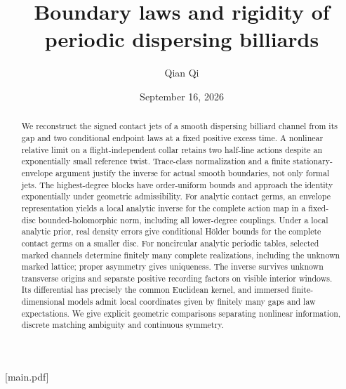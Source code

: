 
[main.pdf]
\title[Boundary laws and periodic rigidity]{Boundary laws and rigidity of periodic dispersing billiards}
\author{Qian Qi}
\date{September 16, 2026}


\begin{abstract}
We reconstruct the signed contact jets of a smooth dispersing billiard
channel from its gap and two conditional endpoint laws at a fixed positive
excess time. A nonlinear relative limit on a flight-independent collar
retains two half-line actions despite an exponentially small reference
twist. Trace-class normalization and a finite stationary-envelope argument
justify the inverse for actual smooth boundaries, not only formal jets.
The highest-degree blocks have order-uniform bounds and approach the
identity exponentially under geometric admissibility.
For analytic contact germs, an envelope representation yields a local
analytic inverse for the complete action map in a fixed-disc
bounded-holomorphic norm, including all lower-degree couplings.
Under a local analytic prior, real density errors give conditional
H\"older bounds for the complete contact germs on a smaller disc.
For noncircular analytic periodic tables, selected marked channels determine
finitely many complete realizations, including the unknown marked lattice;
proper asymmetry gives uniqueness. The inverse survives unknown transverse
origins and separate positive recording factors on visible interior windows.
Its differential has precisely the common Euclidean kernel, and immersed
finite-dimensional models admit local coordinates given by finitely many
gaps and law expectations. We give explicit geometric comparisons separating
nonlinear information, discrete matching ambiguity and continuous symmetry.
\end{abstract}
\maketitle
\enlargethispage{2pt}
\setcounter{tocdepth}{1}
\tableofcontents

